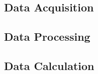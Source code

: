 \documentclass{article}
\begin{document}
\subsection{Data Acquisition}
\begin{center}
	\parbox{.85\textwidth}{
	}
\end{center}

\subsection{Data Processing}
\begin{center}
	\parbox{.85\textwidth}{
	}
\end{center}

\subsection{Data Calculation}
\begin{center}
	\parbox{.85\textwidth}{
	}
\end{center}
\end{document}
